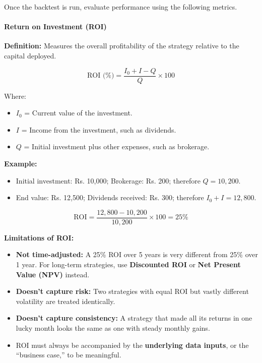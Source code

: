 \documentclass[12pt,openany]{book}
\begin{document}
Once the backtest is run, evaluate performance using the following metrics.

\paragraph{Return on Investment (ROI)}

\textbf{Definition:} Measures the overall profitability of the strategy relative to the capital deployed.

\begin{equation*}
    \text{ROI (\%)} = \frac{I_0 + I - Q}{Q} \times 100
\end{equation*}

Where:
\begin{itemize}[leftmargin=*]
    \item $I_0$ = Current value of the investment.
    \item $I$ = Income from the investment, such as dividends.
    \item $Q$ = Initial investment plus other expenses, such as brokerage.
\end{itemize}

\textbf{Example:}
\begin{itemize}[leftmargin=*]
    \item Initial investment: Rs. 10,000; Brokerage: Rs. 200; therefore $Q = 10{,}200$.
    \item End value: Rs. 12,500; Dividends received: Rs. 300; therefore $I_0 + I = 12{,}800$.
\end{itemize}

\begin{equation*}
    \text{ROI} = \frac{12{,}800 - 10{,}200}{10{,}200} \times 100 = 25\%
\end{equation*}

\textbf{Limitations of ROI:}
\begin{itemize}[leftmargin=*]
    \item \textbf{Not time-adjusted:} A 25\% ROI over 5 years is very different from 25\% over 1 year. For long-term strategies, use \textbf{Discounted ROI} or \textbf{Net Present Value (NPV)} instead.
    \item \textbf{Doesn't capture risk:} Two strategies with equal ROI but vastly different volatility are treated identically.
    \item \textbf{Doesn't capture consistency:} A strategy that made all its returns in one lucky month looks the same as one with steady monthly gains.
    \item ROI must always be accompanied by the \textbf{underlying data inputs}, or the ``business case,'' to be meaningful.
\end{itemize}
\end{document}
